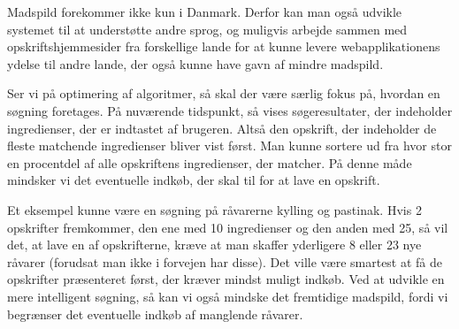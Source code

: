 Madspild forekommer ikke kun i Danmark. Derfor kan man også udvikle systemet til at understøtte andre sprog, og muligvis arbejde sammen med opskriftshjemmesider fra forskellige lande for at kunne levere webapplikationens ydelse til andre lande, der også kunne have gavn af mindre madspild.

Ser vi på optimering af algoritmer, så skal der være særlig fokus på, hvordan en søgning foretages. På nuværende tidspunkt, så vises søgeresultater, der indeholder ingredienser, der er indtastet af brugeren. Altså den opskrift, der indeholder de fleste matchende ingredienser bliver vist først. Man kunne \fx sortere ud fra hvor stor en procentdel af alle opskriftens ingredienser, der matcher. På denne måde mindsker vi det eventuelle indkøb, der skal til for at lave en opskrift. 

Et eksempel kunne være en søgning på råvarerne kylling og pastinak. Hvis 2 opskrifter fremkommer, den ene med 10 ingredienser og den anden med 25, så vil det, at lave en af opskrifterne, kræve at man skaffer yderligere 8 eller 23 nye råvarer (forudsat man ikke i forvejen har disse). Det ville være smartest at få de opskrifter præsenteret først, der kræver mindst muligt indkøb. Ved at udvikle en mere intelligent søgning, så kan vi også mindske det fremtidige madspild, fordi vi begrænser det eventuelle indkøb af manglende råvarer.
